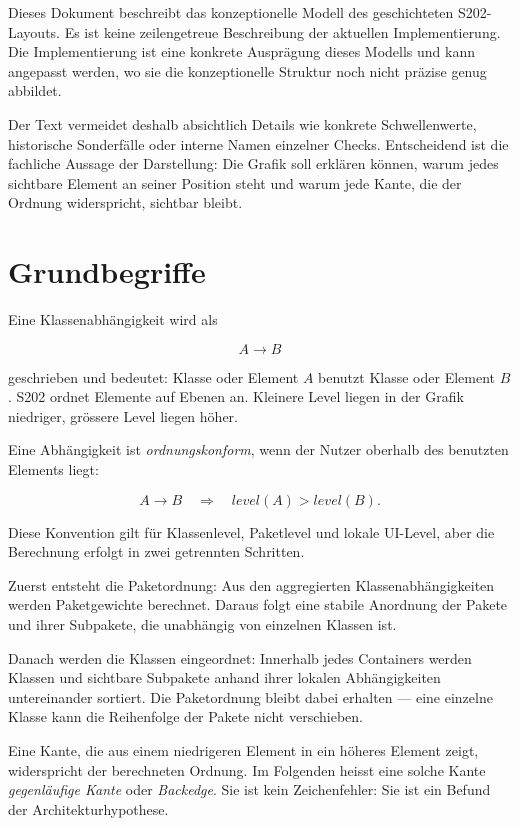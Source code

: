 \documentclass[a4paper,11pt]{article}
\begin{document}
Dieses Dokument beschreibt das konzeptionelle Modell des geschichteten
S202-Layouts. Es ist keine zeilengetreue Beschreibung der aktuellen
Implementierung. Die Implementierung ist eine konkrete Auspr\"agung dieses
Modells und kann angepasst werden, wo sie die konzeptionelle Struktur noch
nicht pr\"azise genug abbildet.

Der Text vermeidet deshalb absichtlich Details wie konkrete Schwellenwerte,
historische Sonderf\"alle oder interne Namen einzelner Checks. Entscheidend
ist die fachliche Aussage der Darstellung: Die Grafik soll erkl\"aren k\"onnen,
warum jedes sichtbare Element an seiner Position steht und warum jede Kante,
die der Ordnung widerspricht, sichtbar bleibt.

\section{Grundbegriffe}

Eine Klassenabh\"angigkeit wird als

\[
  A \to B
\]

geschrieben und bedeutet: Klasse oder Element $A$ benutzt Klasse oder
Element $B$. S202 ordnet Elemente auf Ebenen an. Kleinere Level liegen in
der Grafik niedriger, gr\"ossere Level liegen h\"oher.

Eine Abh\"angigkeit ist \emph{ordnungskonform}, wenn der Nutzer oberhalb des
benutzten Elements liegt:

\[
  A \to B \quad\Longrightarrow\quad level(A) > level(B).
\]

Diese Konvention gilt f\"ur Klassenlevel, Paketlevel und lokale UI-Level,
aber die Berechnung erfolgt in zwei getrennten Schritten.

Zuerst entsteht die Paketordnung: Aus den aggregierten Klassenabh\"angigkeiten
werden Paketgewichte berechnet. Daraus folgt eine stabile Anordnung der
Pakete und ihrer Subpakete, die unabh\"angig von einzelnen Klassen ist.

Danach werden die Klassen eingeordnet: Innerhalb jedes Containers werden
Klassen und sichtbare Subpakete anhand ihrer lokalen Abh\"angigkeiten
untereinander sortiert. Die Paketordnung bleibt dabei erhalten --- eine
einzelne Klasse kann die Reihenfolge der Pakete nicht verschieben.

Eine Kante, die aus einem niedrigeren Element in ein h\"oheres Element zeigt,
widerspricht der berechneten Ordnung. Im Folgenden heisst eine solche Kante
\emph{gegenl\"aufige Kante} oder \emph{Backedge}. Sie ist kein Zeichenfehler:
Sie ist ein Befund der Architekturhypothese.
\end{document}
